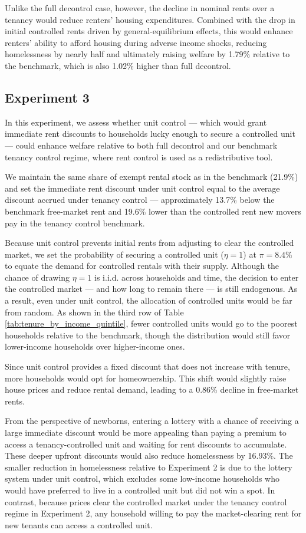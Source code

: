 \documentclass[parskip=full]{article}
\begin{document}
Unlike the full decontrol case, however, the decline in nominal rents over a tenancy would reduce renters’ housing expenditures. Combined with the drop in initial controlled rents driven by general-equilibrium effects, this would enhance renters’ ability to afford housing during adverse income shocks, reducing homelessness by nearly half and ultimately raising welfare by 1.79\% relative to the benchmark, which is also 1.02\% higher than full decontrol.

\subsection{Experiment 3}\label{sec:exp_3}

In this experiment, we assess whether unit control — which would grant immediate rent discounts to households lucky enough to secure a controlled unit — could enhance welfare relative to both full decontrol and our benchmark tenancy control regime, where rent control is used as a redistributive tool.

We maintain the same share of exempt rental stock as in the benchmark (21.9\%) and set the immediate rent discount under unit control equal to the average discount accrued under tenancy control — approximately 13.7\% below the benchmark free-market rent and 19.6\% lower than the controlled rent new movers pay in the tenancy control benchmark. 

Because unit control prevents initial rents from adjusting to clear the controlled market, we set the probability of securing a controlled unit ($\eta=1$) at $\pi=8.4\%$ to equate the demand for controlled rentals with their supply. Although the chance of drawing $\eta=1$ is i.i.d. across households and time, the decision to enter the controlled market — and how long to remain there — is still endogenous. As a result, even under unit control, the allocation of controlled units would be far from random. As shown in the third row of Table \ref{tab:tenure_by_income_quintile}, fewer controlled units would go to the poorest households relative to the benchmark, though the distribution would still favor lower-income households over higher-income ones.

Since unit control provides a fixed discount that does not increase with tenure, more households would opt for homeownership. This shift would slightly raise house prices and reduce rental demand, leading to a 0.86\% decline in free-market rents.

From the perspective of newborns, entering a lottery with a chance of receiving a large immediate discount would be more appealing than paying a premium to access a tenancy-controlled unit and waiting for rent discounts to accumulate. These deeper upfront discounts would also reduce homelessness by 16.93\%. The smaller reduction in homelessness relative to Experiment 2 is due to the lottery system under unit control, which excludes some low-income households who would have preferred to live in a controlled unit but did not win a spot. In contrast, because prices clear the controlled market under the tenancy control regime in Experiment 2, any household willing to pay the market-clearing rent for new tenants can access a controlled unit.
\end{document}
